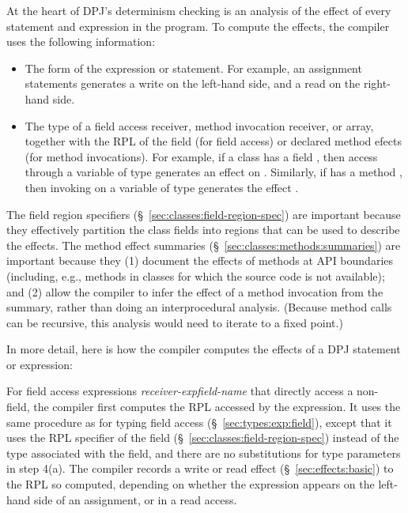 At the heart of DPJ's determinism checking is an analysis of the
effect of every statement and expression in the program.  To compute
the effects, the compiler uses the following information:
%
\begin{itemize}
%
\item The form of the expression or statement.  For example,
  an assignment statements generates a write on the left-hand side,
  and a read on the right-hand side.
%
\item The type of a field access receiver, method invocation receiver,
  or array, together with the RPL of the field (for field access) or
  declared method efects (for method invocations).  For example, if a
  class  has a field , then access
  through a variable of type  generates an effect on
  .  Similarly, if  has a method , then invoking  on a variable of type 
  generates the effect .
%
\end{itemize}
%
The field region specifiers (\S~\ref{sec:classes:field-region-spec})
are important because they effectively partition the class fields into
regions that can be used to describe the effects.  The method effect
summaries (\S~\ref{sec:classes:methods:summaries}) are important
because they (1) document the effects of methods at API boundaries
(including, e.g., methods in classes for which the source code is not
available); and (2) allow the compiler to infer the effect of a method
invocation from the summary, rather than doing an interprocedural
analysis.  (Because method calls can be recursive, this analysis would
need to iterate to a fixed point.)

In more detail, here is how the compiler computes the effects of a
DPJ statement or expression:

 For field access expressions
\emph{receiver-exp}\emph{field-name} that directly access a
non- field, the compiler first computes the RPL accessed by
the expression.  It uses the same procedure as for typing field access
(\S~\ref{sec:types:exp:field}), except that it uses the RPL specifier
of the field (\S~\ref{sec:classes:field-region-spec}) instead of the
type associated with the field, and there are no substitutions for
type parameters in step 4(a).  The compiler records a write or read
effect (\S~\ref{sec:effects:basic}) to the RPL so computed, depending
on whether the expression appears on the left-hand side of an
assignment, or in a read access.

